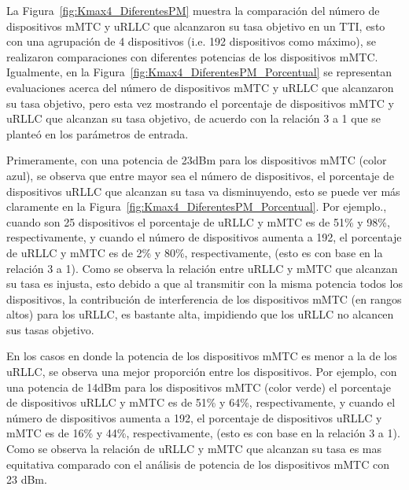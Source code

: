 La Figura~\ref{fig:Kmax4_DiferentesPM} muestra la comparación del número de dispositivos mMTC y uRLLC que alcanzaron su tasa objetivo en un TTI, esto con una agrupación de 4 dispositivos (i.e. 192 dispositivos como máximo), se realizaron comparaciones con diferentes potencias de los dispositivos mMTC. Igualmente, en la Figura~\ref{fig:Kmax4_DiferentesPM_Porcentual} se representan evaluaciones acerca del número de dispositivos mMTC y uRLLC que alcanzaron su tasa objetivo, pero esta vez mostrando el porcentaje de dispositivos mMTC y uRLLC que alcanzan su tasa objetivo, de acuerdo con la relación 3 a 1 que se planteó en los parámetros de entrada.\newline

Primeramente, con una potencia de 23dBm para los dispositivos mMTC (color azul), se observa que entre mayor sea el número de dispositivos, el porcentaje de dispositivos uRLLC que alcanzan su tasa va disminuyendo, esto se puede ver más claramente en la Figura~\ref{fig:Kmax4_DiferentesPM_Porcentual}. Por ejemplo., cuando son 25 dispositivos el porcentaje de uRLLC y mMTC es de 51\% y 98\%, respectivamente, y cuando el número de dispositivos aumenta a 192, el porcentaje de uRLLC y mMTC es de 2\% y 80\%, respectivamente, (esto es con base en la relación 3 a 1). Como se observa la relación entre uRLLC y mMTC que alcanzan su tasa es injusta, esto debido a que al transmitir con la misma potencia todos los dispositivos, la contribución de interferencia de los dispositivos mMTC (en rangos altos) para los uRLLC, es bastante alta, impidiendo que los uRLLC no alcancen sus tasas objetivo.\newline

En los casos en donde la potencia de los dispositivos mMTC es menor a la de los uRLLC, se observa una mejor proporción entre los dispositivos. Por ejemplo, con una potencia de 14dBm para los dispositivos mMTC (color verde) el porcentaje de dispositivos uRLLC y mMTC es de 51\% y 64\%, respectivamente, y cuando el número de dispositivos aumenta a 192, el porcentaje de dispositivos uRLLC y mMTC es de 16\% y 44\%, respectivamente, (esto es con base en la relación 3 a 1). Como se observa la relación de uRLLC y mMTC que alcanzan su tasa es mas equitativa comparado con el análisis de potencia de los dispositivos mMTC con 23 dBm. \newline

\break

